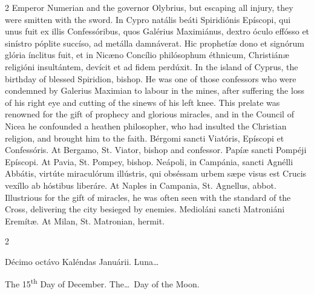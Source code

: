 \begin{paracol}{2}
 Emperor Numerian and the governor Olybrius, but escaping all injury, they 
 were smitten with the sword.
\switchcolumn*
{}
In Cypro natális beáti 
 Spiridiónis Epíscopi, qui unus fuit ex illis Confessóribus, quos Galérius 
 Maximiánus, dextro óculo effósso et sinístro póplite succíso, ad metálla damnáverat. Hic prophetíæ dono et signórum glória 
 ínclitus fuit, et in 
 Nicæno Concílio philósophum éthnicum, Christiánæ religióni insultántem, 
 devícit et ad fidem perdúxit.
\switchcolumn
{}
In the island of Cyprus, the 
 birthday of blessed Spiridion, bishop. He was one of those confessors 
 who were condemned by Galerius Maximian to labour in the mines, after 
 suffering the loss of his right eye and cutting of the sinews of his left 
 knee. This prelate was renowned for the gift of prophecy and glorious 
 miracles, and in the Council of Nicea he confounded a heathen philosopher, 
 who had insulted the Christian religion, and brought him to the faith.
\switchcolumn*
{}
Bérgomi sancti Viatóris, 
 Epíscopi et Confessóris.
\switchcolumn
{}
At Bergamo, St. Viator, bishop and 
 confessor.
\switchcolumn*
{}
Papíæ sancti Pompéji 
 Epíscopi.
\switchcolumn
{}
At Pavia, St. Pompey, bishop.
\switchcolumn*
{}
Neápoli, in Campánia, 
 sancti Agnélli Abbátis, virtúte miraculórum illústris, qui obséssam urbem 
 sæpe visus est Crucis vexíllo ab hóstibus liberáre.
\switchcolumn
{}
At Naples in Campania, St. Agnellus, 
 abbot. Illustrious for the gift of miracles, he was often seen with 
 the standard of the Cross, delivering the city besieged by enemies.
\switchcolumn*
{}
Medioláni sancti 
 Matroniáni Eremítæ.
\switchcolumn
{}
At Milan, St. Matronian, hermit.
\switchcolumn*
{}
\end{paracol}


\begin{paracol}{2}
\begin{center}{\color{gregoriocolor} Décimo octávo Kaléndas Januárii. 
 Luna\dots\ }\end{center}
\switchcolumn
{}
\begin{center}{\color{gregoriocolor} The 
 15\textsuperscript{th} Day of 
 December. The\dots\ Day of the Moon.}\end{center}
\end{paracol}

